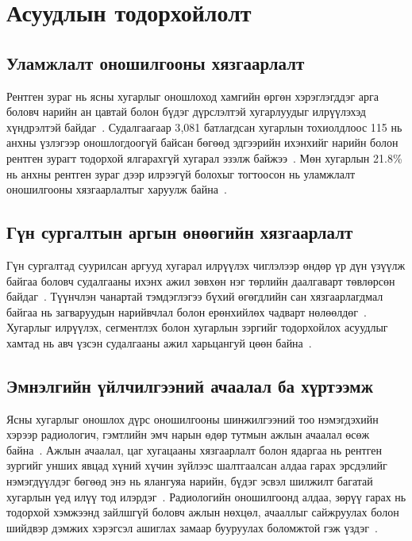 \section{Асуудлын тодорхойлолт}

\subsection*{Уламжлалт оношилгооны хязгаарлалт}

Рентген зураг нь ясны хугарлыг оношлоход хамгийн өргөн хэрэглэгддэг арга боловч нарийн ан цавтай болон бүдэг дүрслэлтэй хугарлуудыг илрүүлэхэд хүндрэлтэй байдаг~\cite{ref10}. Судалгаагаар 3{,}081 батлагдсан хугарлын тохиолдлоос 115 нь анхны үзлэгээр оношлогдоогүй байсан бөгөөд эдгээрийн ихэнхийг нарийн болон рентген зурагт тодорхой ялгарахгүй хугарал эзэлж байжээ~\cite{ref11}. Мөн хугарлын 21.8\% нь анхны рентген зураг дээр илрээгүй болохыг тогтоосон нь уламжлалт оношилгооны хязгаарлалтыг харуулж байна~\cite{ref12}.

\subsection*{Гүн сургалтын аргын өнөөгийн хязгаарлалт}

Гүн сургалтад суурилсан аргууд хугарал илрүүлэх чиглэлээр өндөр үр дүн үзүүлж байгаа боловч судалгааны ихэнх ажил зөвхөн нэг төрлийн даалгаварт төвлөрсөн байдаг~\cite{ref13}. Түүнчлэн чанартай тэмдэглэгээ бүхий өгөгдлийн сан хязгаарлагдмал байгаа нь загваруудын нарийвчлал болон ерөнхийлөх чадварт нөлөөлдөг~\cite{ref14}. Хугарлыг илрүүлэх, сегментлэх болон хугарлын зэргийг тодорхойлох асуудлыг хамтад нь авч үзсэн судалгааны ажил харьцангуй цөөн байна~\cite{ref15}.

\subsection*{Эмнэлгийн үйлчилгээний ачаалал ба хүртээмж}

Ясны хугарлыг оношлох дүрс оношилгооны шинжилгээний тоо нэмэгдэхийн хэрээр радиологич, гэмтлийн эмч нарын өдөр тутмын ажлын ачаалал өсөж байна~\cite{ref16}. Ажлын ачаалал, цаг хугацааны хязгаарлалт болон ядаргаа нь рентген зургийг унших явцад хүний хүчин зүйлээс шалтгаалсан алдаа гарах эрсдэлийг нэмэгдүүлдэг бөгөөд энэ нь ялангуяа нарийн, бүдэг эсвэл шилжилт багатай хугарлын үед илүү тод илэрдэг~\cite{ref07,ref17,ref18}. Радиологийн оношилгоонд алдаа, зөрүү гарах нь тодорхой хэмжээнд зайлшгүй боловч ажлын нөхцөл, ачааллыг сайжруулах болон шийдвэр дэмжих хэрэгсэл ашиглах замаар бууруулах боломжтой гэж үздэг~\cite{ref05}.

